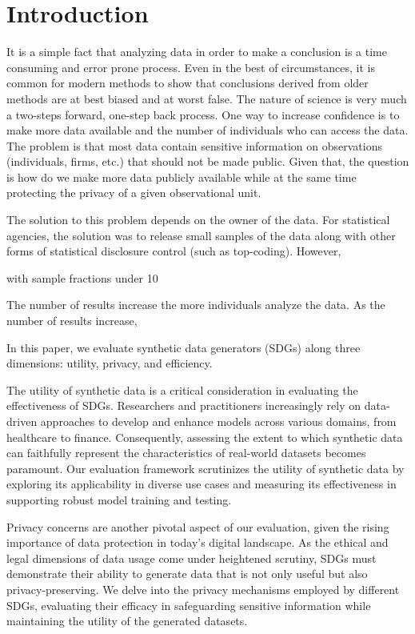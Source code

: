 \documentclass[runningheads]{llncs}
\begin{document}
\section{Introduction}

It is a simple fact that analyzing data in order to make a conclusion is a time consuming and error prone process.  Even in the best of circumstances, it is common for modern methods to show that conclusions derived from older methods are at best biased and at worst false.  The nature of science is very much a two-steps forward, one-step back process.  One way to increase confidence is to make more data available and the number of individuals who can access the data.  The problem is that most data contain sensitive information on observations (individuals, firms, etc.) that should not be made public.  Given that, the question is how do we make more data publicly available while at the same time protecting the privacy of a given observational unit.

The solution to this problem depends on the owner of the data.  For statistical agencies, the solution was to release small samples of the data along with other forms of statistical disclosure control (such as top-coding).  However, 

with sample fractions under 10%



The number of results increase the more individuals analyze the data.  As the number of results increase, 

In this paper, we evaluate synthetic data generators (SDGs) along three dimensions: utility, privacy, and efficiency.  

The utility of synthetic data is a critical consideration in evaluating the effectiveness of SDGs. Researchers and practitioners increasingly rely on data-driven approaches to develop and enhance models across various domains, from healthcare to finance. Consequently, assessing the extent to which synthetic data can faithfully represent the characteristics of real-world datasets becomes paramount. Our evaluation framework scrutinizes the utility of synthetic data by exploring its applicability in diverse use cases and measuring its effectiveness in supporting robust model training and testing.

Privacy concerns are another pivotal aspect of our evaluation, given the rising importance of data protection in today's digital landscape. As the ethical and legal dimensions of data usage come under heightened scrutiny, SDGs must demonstrate their ability to generate data that is not only useful but also privacy-preserving. We delve into the privacy mechanisms employed by different SDGs, evaluating their efficacy in safeguarding sensitive information while maintaining the utility of the generated datasets.
\end{document}
